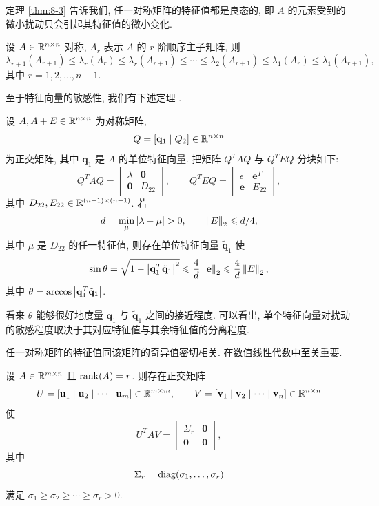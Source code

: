 定理 \ref{thm:8-3} 告诉我们, 任一对称矩阵的特征值都是良态的, 即 $A$ 的元素受到的微小扰动只会引起其特征值的微小变化.

\begin{theorem}
\label{thm:8-4}
设 $A\in\mathbb{R}^{n\times n}$ 对称, $A_r$ 表示 $A$ 的 $r$ 阶顺序主子矩阵, 则
\[
  \lambda_{r+1}(A_{r+1})\leqslant\lambda_r(A_r)\leqslant\lambda_r(A_{r+1})
  \leqslant\cdots\leqslant\lambda_2(A_{r+1})\leqslant\lambda_1(A_r)
  \leqslant\lambda_1(A_{r+1}),
\]
其中 $r=1,2,\ldots,n-1$.
\end{theorem}

至于特征向量的敏感性, 我们有下述定理 \cite{src:95}.

\begin{theorem}
\label{thm:8-5}
设 $A,A+E\in\mathbb{R}^{n\times n}$ 为对称矩阵,
\[
  Q=[\mathbf{q}_1\mid Q_2]\in\mathbb{R}^{n\times n}
\]
为正交矩阵, 其中 $\mathbf{q}_1$ 是 $A$ 的单位特征向量. 把矩阵 $Q^TAQ$ 与 $Q^TEQ$ 分块如下:
\[
  Q^TAQ=\begin{bmatrix}
    \lambda & \mathbf{0}\\
    \mathbf{0} & D_{22}
  \end{bmatrix},
  \qquad
  Q^TEQ=\begin{bmatrix}
    \epsilon & \mathbf{e}^T\\
    \mathbf{e} & E_{22}
  \end{bmatrix},
\]
其中 $D_{22},E_{22}\in\mathbb{R}^{(n-1)\times(n-1)}$. 若
\[
  d=\min_{\mu}\abs{\lambda-\mu}>0,
  \qquad
  \norm{E}_2\leqslant d/4,
\]
其中 $\mu$ 是 $D_{22}$ 的任一特征值, 则存在单位特征向量 $\tilde{\mathbf{q}}_1$ 使
\[
  \sin\theta=\sqrt{1-\left|\mathbf{q}_1^T\tilde{\mathbf{q}}_1\right|^2}
  \leqslant\frac{4}{d}\left\|\mathbf{e}\right\|_2\leqslant\frac{4}{d}\left\|E\right\|_2,
\]
其中 $\theta=\arccos\left|\mathbf{q}_1^T\tilde{\mathbf{q}}_1\right|$.
\end{theorem}

看来 $\theta$ 能够很好地度量 $\mathbf{q}_1$ 与 $\tilde{\mathbf{q}}_1$ 之间的接近程度. 可以看出, 单个特征向量对扰动的敏感程度取决于其对应特征值与其余特征值的分离程度.

任一对称矩阵的特征值同该矩阵的奇异值密切相关.  \cite{src:32} 在数值线性代数中至关重要.

\begin{theorem}[奇异值分解定理]
\label{thm:8-6}
设 $A\in\mathbb{R}^{m\times n}$ 且 $\operatorname{rank}(A)=r$. 则存在正交矩阵
\[
  U=[\mathbf{u}_1\mid\mathbf{u}_2\mid\cdots\mid\mathbf{u}_m]\in\mathbb{R}^{m\times m},
  \qquad
  V=[\mathbf{v}_1\mid\mathbf{v}_2\mid\cdots\mid\mathbf{v}_n]\in\mathbb{R}^{n\times n}
\]
使
\[
  U^TAV=\begin{bmatrix}
    \Sigma_r & \mathbf{0}\\
    \mathbf{0} & \mathbf{0}
  \end{bmatrix},
\]
其中
\[
  \Sigma_r=\operatorname{diag}(\sigma_1,\ldots,\sigma_r)
\]
满足 $\sigma_1\geqslant\sigma_2\geqslant\cdots\geqslant\sigma_r>0$.
\end{theorem}

